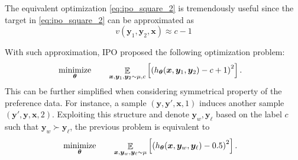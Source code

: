 \documentclass[11pt,a4paper]{article}
\begin{document}
The equivalent optimization \eqref{eq:ipo_square_2} is tremendously useful since the target in \eqref{eq:ipo_square_2} can be approximated as
\[
v(\bm{y}_1, \bm{y}_2, \bm{x}) \approx c-1
\]

With such approximation, IPO proposed the following optimization problem:
\begin{alignat}{2}
    & \operatorname*{\text{minimize}}_{\boldsymbol \theta} \quad && \mathop{\mathbb{E}}_{\bm{x}, \bm{y}_1, \bm{y}_2\sim \mu, c} \left[ \left(  h_{\boldsymbol \theta}(\bm{x}, \bm{y}_1, \bm{y}_2)  - c+1 \right) ^2\right].
\end{alignat}
This can be further simplified when considering symmetrical property of the preference data. For instance, a sample $(\bm{y}, \bm{y}', \bm{x}, 1)$ induces another sample $(\bm{y}', \bm{y}, \bm{x}, 2)$.
Exploiting this structure and denote $\bm{y}_w, \bm{y}_\ell $ based on the label $c$ such that $\bm{y}_w \succ \bm{y}_\ell $, the previous problem is equivalent to
\begin{alignat}{2}
    & \operatorname*{\text{minimize}}_{\boldsymbol \theta} \quad && \mathop{\mathbb{E}}_{\bm{x}, \bm{y}_w, \bm{y}_{\ell }\sim \mu} \left[ \left(  h_{\boldsymbol \theta}(\bm{x}, \bm{y}_w, \bm{y}_\ell )  - 0.5 \right) ^2\right].
\end{alignat}
\end{document}
